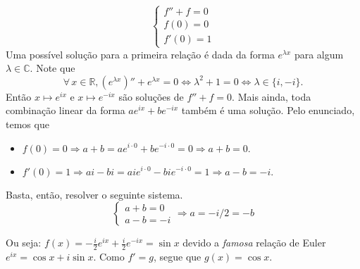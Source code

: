 \documentclass{IMTexam}
\begin{document}
\begin{questions}
\begin{solution}
			$$\begin{cases}
				f''+ f = 0\\
				f(0) = 0\\
				f'(0) = 1
			\end{cases}$$
			Uma possível solução para a primeira relação é dada da forma $e^{\lambda x}$ para algum $\lambda \in \mathbb C$. Note que
			$$\forall\,x\in\mathbb R, (e^{\lambda x})'' + e^{\lambda x} = 0 \iff \lambda^2 + 1 = 0 \iff \lambda \in \{i,-i\}.$$
			Então $x\longmapsto e^{ix}$ e $x\longmapsto e^{-ix}$ são soluções de $f''+f = 0$. Mais ainda, toda combinação linear da forma $ae^{ix}+be^{-ix}$ também é uma solução. Pelo enunciado, temos que
			\begin{itemize}
				\item $f(0)=0 \Rightarrow a+b=ae^{i\cdot 0}+be^{-i\cdot 0} = 0 \Rightarrow a +b=0.$
				\item $f'(0)= 1 \Rightarrow ai - bi = aie^{i\cdot 0}- bi e^{-i\cdot 0}   = 1 \Rightarrow a-b  = -i.$
			\end{itemize}
			Basta, então, resolver o seguinte sistema. 
			$$
			\begin{cases}
				a + b = 0\\
				a - b = -i
			\end{cases}\Rightarrow \boxed{a = -i/2 = -b}$$
			
			Ou seja: $f(x) = -\frac i2 e^{ix}+ \frac i2e^{-ix} = \sin x$ devido a \textit{famosa} relação de Euler $e^{ix}=\cos x + i\sin x$. Como $f' = g$, segue que $g(x) = \cos x$.
		\end{solution}
	

\end{questions}
\end{document}
